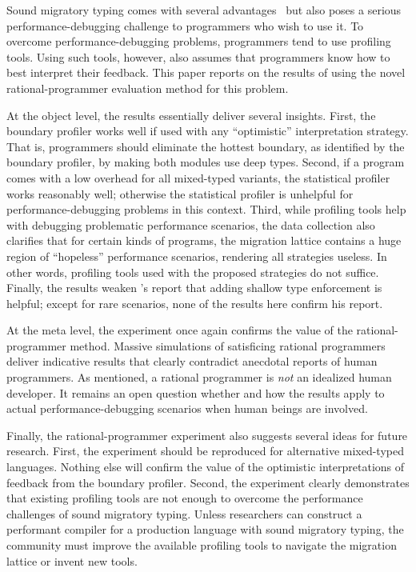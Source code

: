 

Sound migratory typing comes with several advantages~\cite{lgfd-icfp-2021} 
but also poses a serious performance-debugging challenge to
programmers who wish to use it. To overcome performance-debugging problems,
programmers tend to use profiling tools. Using such tools, however, also assumes
that programmers know how to best interpret their feedback. This paper reports
on the results of using the novel rational-programmer evaluation method for this
problem.

At the object level, the results essentially deliver several insights. First,
the boundary profiler works well if used with any ``optimistic''
interpretation strategy. That is, programmers should eliminate the hottest
boundary, as identified by the boundary profiler, by making both modules
use deep types. Second, if a program comes with a low overhead for all
mixed-typed variants, the statistical profiler works reasonably well;
otherwise the statistical profiler is unhelpful for performance-debugging
problems in this context. Third, while profiling tools help with debugging
problematic performance scenarios, the data collection also clarifies that for
certain kinds of programs, the migration lattice contains a huge region
of ``hopeless'' performance scenarios, rendering all strategies
useless. In other words, profiling tools used with the proposed strategies do
not suffice. Finally, the results weaken \citet{g-deep-shallow}'s report that
adding shallow type enforcement is helpful; except for rare scenarios, none of
the results here confirm his report.

At the meta level, the experiment once again confirms the value of the
rational-programmer method. Massive simulations of satisficing rational
programmers deliver indicative results that clearly contradict anecdotal reports
of human programmers. As mentioned, a rational programmer is {\em not\/} an
idealized human developer. It remains an open question whether and how the
results apply to actual performance-debugging scenarios when human beings are
involved.

Finally, the rational-programmer experiment also suggests several ideas for
future research. First, the experiment should be reproduced for alternative
mixed-typed languages. Nothing else will confirm the value of the optimistic
interpretations of feedback from the boundary profiler. Second, the
experiment clearly demonstrates that existing profiling tools are not enough to
overcome the performance challenges of sound migratory typing. Unless researchers
can construct a performant compiler for a production language with sound migratory 
typing, the community must improve the available profiling tools to navigate the
migration lattice or invent new tools.



